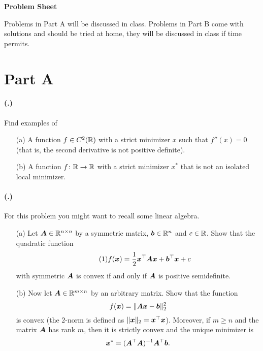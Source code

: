 \documentclass{article}
\newcounter{problemSheetNumber}
\newcounter{problems}
\renewcommand{\problem}{\paragraph{(\theproblemSheetNumber.\theproblems)}\addtocounter{problems}{1}}
\begin{document}
 
\begin{center}
{\Large {\bf Problem Sheet \theproblemSheetNumber}}
\end{center}

Problems in Part A will be discussed in class. Problems in Part B come with solutions and should be tried at home, they will be discussed in class if time permits. 

\section*{Part A}

 \problem Find examples of
\begin{itemize}
 \item[(a)] A function $f\in C^2(\mathbb{R})$ with a strict minimizer $x$ such that $f''(x)=0$ (that is, the second derivative is not positive definite).
 \item[(b)] A function $f\colon \mathbb{R}\to \mathbb{R}$ with a strict minimizer $x^*$ that is not an isolated local minimizer.
\end{itemize}

\problem For this problem you might want to recall some linear algebra.
\begin{itemize} 
 \item[(a)] Let $\bm{A}\in \mathbb{R}^{n\times n}$ by a symmetric matrix, $\bm{b}\in \mathbb{R}^n$ and $c\in \mathbb{R}$. Show that the quadratic function
 \begin{equation}\label{eq:quad}\tag{1}
f(\bm{x}) = \frac{1}{2}\bm{x}^{\top}\bm{A}\bm{x}+\bm{b}^{\top}\bm{x}+c  
 \end{equation}
 with symmetric $\bm{A}$
is convex if and only if $\bm{A}$ is positive semidefinite.
\item[(b)] Now let $\bm{A}\in \mathbb{R}^{m\times n}$ by an arbitrary matrix. Show that the function
\begin{equation*}
 f(\bm{x}) = \Vert {\bm{A}\bm{x}-\bm{b}}\Vert_2^2
\end{equation*}
is convex (the $2$-norm is defined as $\Vert {\bm{x}}\Vert_2=\bm{x}^{\top}\bm{x}$). Moreover, if $m\geq n$ and the matrix $\bm{A}$ has rank $m$, then it is strictly convex and the unique minimizer is
\begin{equation*}
 \bm{x}^* = (\bm{A}^{\top}\bm{A})^{-1}\bm{A}^{\top}\bm{b}.
\end{equation*}
\end{itemize}
\end{document}
